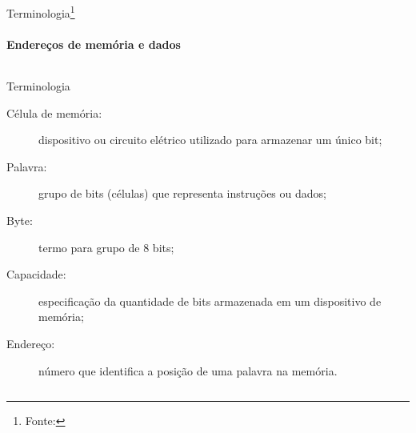 \begin{frame}{Terminologia\footnote{\tiny Fonte: \tocciref}}
  \framesubtitle{Endereços de memória e dados}
  \setcounter{wordno}{0}

\begin{columns}
\begin{column}{0.5\textwidth}
\scriptsize
\begin{block}{Terminologia}
  \begin{description}
  \item[Célula de memória:] dispositivo ou circuito elétrico utilizado
    para armazenar um único bit;
  \item[Palavra:] grupo de bits (células) que representa instruções ou dados;
  \item[Byte:] termo para grupo de 8 bits;
  \item[Capacidade:] especificação da quantidade de bits armazenada em
    um dispositivo de memória;
  \item[Endereço:] número que identifica a posição de uma palavra na memória.
  \end{description}
  
\end{block}
\end{column}

\begin{column}{0.5\textwidth}
  \begin{center}
\end{center}
\end{column}

\end{columns}
\end{frame}


